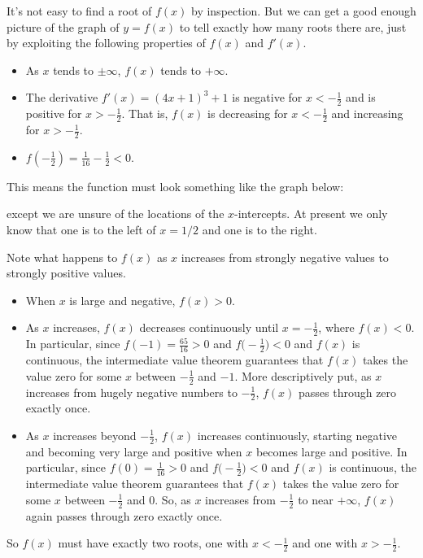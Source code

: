 \begin{solution}
It's not easy to find a root of $f(x)$ by inspection. But we can  get a good enough picture of the graph of $y=f(x)$ to tell exactly how many roots there are, just by exploiting the following properties  of $f(x)$ and $f'(x)$.
\begin{itemize}
\item As $x$ tends to $\pm \infty$, $f(x)$ tends to $+\infty$.
\item The derivative $f'(x)=(4x+1)^3+1$ is negative for $x<-\frac{1}{2}$
and is positive for $x>-\frac{1}{2}$. That is, $f(x)$ is decreasing
for $x<-\frac{1}{2}$ and increasing for  $x>-\frac{1}{2}$.
\item $f\left(-\frac{1}{2}\right)=\frac{1}{16}-\frac{1}{2}<0$.
\end{itemize}
This means the function must look something like the graph below:
\begin{center}
\end{center}
except we are unsure of the locations of the $x$-intercepts. At present we only know that one is to
the left of $x=1/2$ and one is to the right.

Note what happens to $f(x)$ as $x$ increases from strongly negative values to strongly positive
values.
\begin{itemize}
\item When $x$ is large and negative, $f(x)>0$.
\item As $x$ increases, $f(x)$ decreases continuously until
$x=-\frac{1}{2}$, where $f(x)<0$.
 In particular, since $f(-1)=\frac{65}{16}>0$ and
         $f\big(-\frac{1}{2}\big)<0$  and $f(x)$ is continuous,
         the intermediate value theorem guarantees that $f(x)$
         takes the value zero for some $x$ between $-\frac{1}{2}$
         and $-1$.
More descriptively put, as $x$ increases from
hugely negative numbers to $-\frac{1}{2}$, $f(x)$ passes  through zero exactly once.
\item As $x$ increases beyond  $-\frac{1}{2}$, $f(x)$ increases
continuously, starting negative and becoming very large and positive
when $x$ becomes large and positive.
 In particular, since $f(0)=\frac{1}{16}>0$ and
         $f\big(-\frac{1}{2}\big)<0$  and $f(x)$ is continuous,
         the intermediate value theorem guarantees that $f(x)$
         takes the value zero for some $x$ between $-\frac{1}{2}$
         and $0$.
So, as $x$ increases from
$-\frac{1}{2}$ to near $+\infty$, $f(x)$  again passes through
zero exactly once.
\end{itemize}
So $f(x)$ must have exactly two roots, one with $x<-\frac{1}{2}$
and one with $x>-\frac{1}{2}$.
\end{solution}


